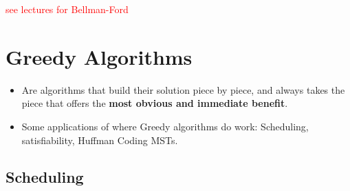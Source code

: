 \documentclass[10pt]{article}
\newcommand{\question}[1]{\textcolor{red}{#1}}
\begin{document}
	\question{see lectures for Bellman-Ford}

	\section{Greedy Algorithms}

	\begin{itemize}
		\item Are algorithms that build their solution piece by piece, and always takes the piece that 
			offers the \textbf{most obvious and immediate benefit}.
		\item Some applications of where Greedy algorithms do work: Scheduling, satisfiability, Huffman Coding
			MSTs. 
	\end{itemize}
	\subsection{Scheduling}
\end{document}
